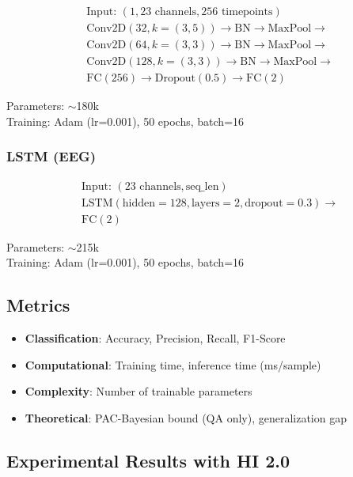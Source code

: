 \documentclass[11pt]{article}
\theoremstyle{remark}
\begin{document}
\begin{align*}
&\text{Input: } (1, 23 \text{ channels}, 256 \text{ timepoints}) \\
&\text{Conv2D}(32, k=(3,5)) \to \text{BN} \to \text{MaxPool} \to \\
&\text{Conv2D}(64, k=(3,3)) \to \text{BN} \to \text{MaxPool} \to \\
&\text{Conv2D}(128, k=(3,3)) \to \text{BN} \to \text{MaxPool} \to \\
&\text{FC}(256) \to \text{Dropout}(0.5) \to \text{FC}(2)
\end{align*}

Parameters: $\sim$180k\\
Training: Adam (lr=0.001), 50 epochs, batch=16

\subsubsection{LSTM (EEG)}

\begin{align*}
&\text{Input: } (23 \text{ channels}, \text{seq\_len}) \\
&\text{LSTM}(\text{hidden}=128, \text{layers}=2, \text{dropout}=0.3) \to \\
&\text{FC}(2)
\end{align*}

Parameters: $\sim$215k\\
Training: Adam (lr=0.001), 50 epochs, batch=16

\subsection{Metrics}

\begin{itemize}
\item \textbf{Classification}: Accuracy, Precision, Recall, F1-Score
\item \textbf{Computational}: Training time, inference time (ms/sample)
\item \textbf{Complexity}: Number of trainable parameters
\item \textbf{Theoretical}: PAC-Bayesian bound (QA only), generalization gap
\end{itemize}

\subsection{Experimental Results with HI 2.0}
\end{document}
